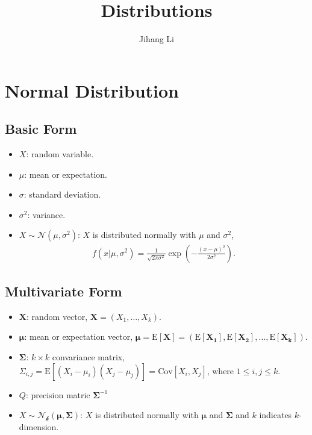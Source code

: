 \documentclass[10pt]{article}
\title{Distributions}
\author{Jihang Li}
\begin{document}
\maketitle
\tableofcontents

\section{Normal Distribution}%
\label{sec:normal}
\subsection{Basic Form}%
\label{sec:basic_form}
\begin{itemize}
  \item $X$: random variable.
  \item $\mu$: mean or expectation.
  \item $\sigma$: standard deviation.
  \item $\sigma^2$: variance.
  \item $X \sim \mathcal{N}(\mu, \sigma^2)$: $X$ is distributed normally with
    $\mu$ and $\sigma^2$,
    \begin{align}
      \label{eq:basic_norm_dist}
      f(x \vert \mu, \sigma^2) = \frac{1}{\sqrt{2\pi \sigma^2}} \exp(- \frac{{(x - \mu)}^2}{2\sigma^2}).
    \end{align}
\end{itemize}

\subsection{Multivariate Form}%
\label{sec:multi_form}
\begin{itemize}
  \item $\mathbf{X}$: random vector, $\mathbf{X} = (X_1, \ldots, X_k)$.
  \item $\boldsymbol\mu$: mean or expectation vector, $\boldsymbol\mu = \text{E}[\mathbf{X}] = (\text{E}[\mathbf{X_1}], \text{E}[\mathbf{X_2}], \ldots, \text{E}[\mathbf{X_k}])$.
  \item $\boldsymbol\Sigma$: $k \times k$ convariance matrix, $\Sigma_{i,j} = \text{E}[(X_i - \mu_i)(X_j - \mu_j)] = \text{Cov}[X_i, X_j]$, where $1 \leq i, j \leq k$.
  \item $Q$: precision matric $\boldsymbol\Sigma^{-1}$
  \item $X \sim \mathcal{N_k}(\boldsymbol\mu, \boldsymbol\Sigma)$: $X$ is distributed normally with
    $\boldsymbol\mu$ and $\boldsymbol\Sigma$ and $k$ indicates $k$-dimension.
\end{itemize}
\end{document}
